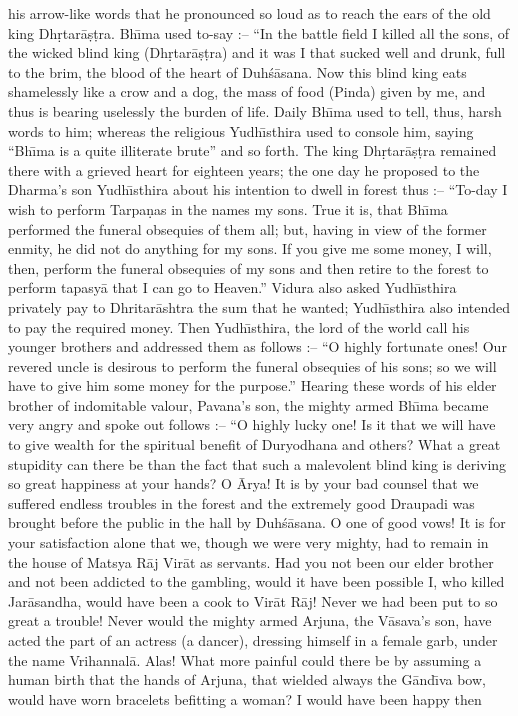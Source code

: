 his arrow-like words that he pronounced so loud as to reach the ears of the old king Dh\d{r}tar\=a\d{s}\d{t}ra. Bh\={\i}ma used to-say :-- ``In the battle field I killed all the sons, of the wicked blind king (Dh\d{r}tar\=a\d{s}\d{t}ra) and it was I that sucked well and drunk, full to the brim, the blood of the heart of Duh\'s\=asana. Now this blind king eats shamelessly like a crow and a dog, the mass of food (Pinda) given by me, and thus is bearing uselessly the burden of life. Daily Bh\={\i}ma used to tell, thus, harsh words to him; whereas the religious Yudh\={\i}sthira used to console him, saying ``Bh\={\i}ma is a quite illiterate brute'' and so forth. The king Dh\d{r}tar\=a\d{s}\d{t}ra remained there with a grieved heart for eighteen years; the one day he proposed to the Dharma's son Yudh\={\i}sthira about his intention to dwell in forest thus :-- ``To-day I wish to perform Tarpa\d{n}as in the names my sons. True it is, that Bh\={\i}ma performed the funeral obsequies of them all; but, having in view of the former enmity, he did not do anything for my sons. If you give me some money, I will, then, perform the funeral obsequies of my sons and then retire to the forest to perform tapasy\=a that I can go to Heaven.'' Vidura also asked Yudh\={\i}sthira privately pay to Dhritar\=ashtra the sum that he wanted; Yudh\={\i}sthira also intended to pay the required money. Then Yudh\={\i}sthira, the lord of the world call his younger brothers and addressed them as follows :-- ``O highly fortunate ones! Our revered uncle is desirous to perform the funeral obsequies of his sons; so we will have to give him some money for the purpose.'' Hearing these words of his elder brother of indomitable valour, Pavana's son, the mighty armed Bh\={\i}ma became very angry and spoke out follows :-- ``O highly lucky one! Is it that we will have to give wealth for the spiritual benefit of Duryodhana and others? What a great stupidity can there be than the fact that such a malevolent blind king is deriving so great happiness at your hands? O \=Arya! It is by your bad counsel that we suffered endless troubles in the forest and the extremely good Draupadi was brought before the public in the hall by Duh\'s\=asana. O one of good vows! It is for your satisfaction alone that we, though we were very mighty, had to remain in the house of Matsya R\=aj Vir\=at as servants. Had you not been our elder brother and not been addicted to the gambling, would it have been possible I, who killed Jar\=asandha, would have been a cook to Vir\=at R\=aj! Never we had been put to so great a trouble! Never would the mighty armed Arjuna, the V\=asava's son, have acted the part of an actress (a dancer), dressing himself in a female garb, under the name Vrihannal\=a. Alas! What more painful could there be by assuming a human birth that the hands of Arjuna, that wielded always the G\=and\={\i}va bow, would have worn bracelets befitting a woman? I would have been happy then

